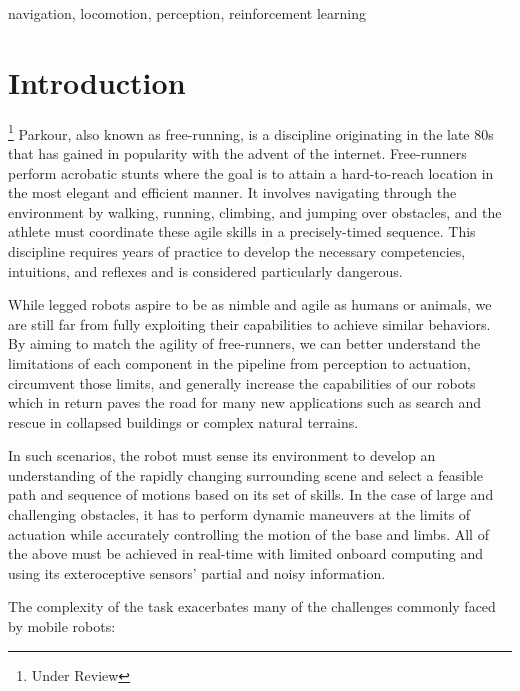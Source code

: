 \documentclass[conference]{IEEEtran}
\begin{document}
\begin{IEEEkeywords}
navigation, locomotion, perception, reinforcement learning
\end{IEEEkeywords}

\section{Introduction}
\footnote{Under Review}
Parkour, also known as free-running, is a discipline originating in the late 80s that has gained in popularity with the advent of the internet. 
Free-runners perform acrobatic stunts where the goal is to attain a hard-to-reach location in the most elegant and efficient manner. 
It involves navigating through the environment by walking, running, climbing, and jumping over obstacles, and the athlete must coordinate these agile skills in a precisely-timed sequence.
This discipline requires years of practice to develop the necessary competencies, intuitions, and reflexes and is considered particularly dangerous.

While legged robots aspire to be as nimble and agile as humans or animals, we are still far from fully exploiting their capabilities to achieve similar behaviors. By aiming to match the agility of free-runners, we can better understand the limitations of each component in the pipeline from perception to actuation, circumvent those limits, and generally increase the capabilities of our robots which in return paves the road for many new applications such as search and rescue in collapsed buildings or complex natural terrains.

In such scenarios, the robot must sense its environment to develop an understanding of the rapidly changing surrounding scene and select a feasible path and sequence of motions based on its set of skills. In the case of large and challenging obstacles, it has to perform dynamic maneuvers at the limits of actuation while accurately controlling the motion of the base and limbs.
All of the above must be achieved in real-time with limited onboard computing and using its exteroceptive sensors' partial and noisy information.

The complexity of the task exacerbates many of the challenges commonly faced by mobile robots:
\end{document}
